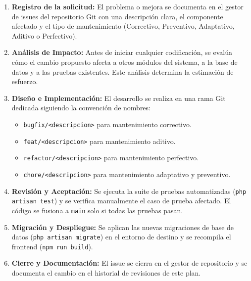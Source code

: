 \begin{enumerate}
    \item \textbf{Registro de la solicitud:} El problema o mejora se documenta en el
          gestor de issues del repositorio Git con una descripción clara, el componente
          afectado y el tipo de mantenimiento (Correctivo, Preventivo, Adaptativo,
          Aditivo o Perfectivo).

    \item \textbf{Análisis de Impacto:} Antes de iniciar cualquier codificación, se
          evalúa cómo el cambio propuesto afecta a otros módulos del sistema, a la base
          de datos y a las pruebas existentes. Este análisis determina la estimación de
          esfuerzo.

    \item \textbf{Diseño e Implementación:} El desarrollo se realiza en una rama Git
          dedicada siguiendo la convención de nombres:
          \begin{itemize}
              \item \texttt{bugfix/<descripcion>} para mantenimiento correctivo.
              \item \texttt{feat/<descripcion>} para mantenimiento aditivo.
              \item \texttt{refactor/<descripcion>} para mantenimiento perfectivo.
              \item \texttt{chore/<descripcion>} para mantenimiento adaptativo y preventivo.
          \end{itemize}

    \item \textbf{Revisión y Aceptación:} Se ejecuta la suite de pruebas automatizadas
          (\texttt{php artisan test}) y se verifica manualmente el caso de prueba
          afectado. El código se fusiona a \texttt{main} solo si todas las pruebas pasan.

    \item \textbf{Migración y Despliegue:} Se aplican las nuevas migraciones de base
          de datos (\texttt{php artisan migrate}) en el entorno de destino y se
          recompila el frontend (\texttt{npm run build}).

    \item \textbf{Cierre y Documentación:} El issue se cierra en el gestor de
          repositorio y se documenta el cambio en el historial de revisiones de este
          plan.
\end{enumerate}

\newpage
